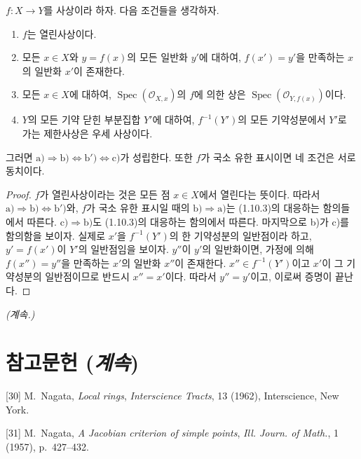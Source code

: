 \begin{corollary}[1.10.4]
\label{IV.1.10.4-ko}
$f:X\to Y$를 사상이라 하자. 다음 조건들을 생각하자.
\begin{enumerate}
  \item[a)] $f$는 열린사상이다.
  \item[b)] 모든 $x\in X$와 $y=f(x)$의 모든 일반화 $y'$에 대하여,
  $f(x')=y'$을 만족하는 $x$의 일반화 $x'$이 존재한다.
  \item[b')] 모든 $x\in X$에 대하여,
  $\operatorname{Spec}(\mathcal O_{X,x})$의 $f$에 의한 상은
  $\operatorname{Spec}(\mathcal O_{Y,f(x)})$이다.
  \item[c)] $Y$의 모든 기약 닫힌 부분집합 $Y'$에 대하여,
  $f^{-1}(Y')$의 모든 기약성분에서 $Y'$로 가는 제한사상은
  우세 사상이다.
\end{enumerate}
그러면
$\mathrm{a)}\Rightarrow\mathrm{b)}\Leftrightarrow\mathrm{b')}
\Leftrightarrow\mathrm{c)}$가 성립한다. 또한 $f$가 국소 유한 표시이면
네 조건은 서로 동치이다.
\end{corollary}
\begin{proof}
$f$가 열린사상이라는 것은 모든 점 $x\in X$에서 열린다는 뜻이다.
따라서 $\mathrm{a)}\Rightarrow\mathrm{b)}\Leftrightarrow
\mathrm{b')}$와, $f$가 국소 유한 표시일 때의
$\mathrm{b)}\Rightarrow\mathrm{a)}$는 (1.10.3)의 대응하는
함의들에서 따른다. $\mathrm{c)}\Rightarrow\mathrm{b)}$도 (1.10.3)의
대응하는 함의에서 따른다. 마지막으로 b)가 c)를 함의함을 보이자.
실제로 $x'$을 $f^{-1}(Y')$의 한 기약성분의 일반점이라 하고,
$y'=f(x')$이 $Y'$의 일반점임을 보이자. $y''$이 $y'$의 일반화이면,
가정에 의해 $f(x'')=y''$을 만족하는 $x'$의 일반화 $x''$이 존재한다.
$x''\in f^{-1}(Y')$이고 $x'$이 그 기약성분의 일반점이므로 반드시
$x''=x'$이다. 따라서 $y''=y'$이고, 이로써 증명이 끝난다.
\end{proof}

\begin{center}
\emph{(계속.)}
\end{center}

\clearpage
{}
{}
\section*{참고문헌 (\emph{계속})}

\begingroup
\small
\setlength{\parindent}{0pt}
\setlength{\parskip}{3pt}
[30] M.~Nagata, \emph{Local rings}, \emph{Interscience Tracts}, 13 (1962),
Interscience, New York.

[31] M.~Nagata, \emph{A Jacobian criterion of simple points},
\emph{Ill. Journ. of Math.}, 1 (1957), p.~427--432.

